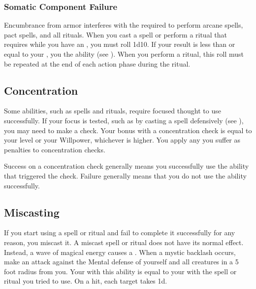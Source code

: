         \subsubsection{Somatic Component Failure}\label{Somatic Component Failure}
            Encumbrance from armor interferes with the  required to perform arcane spells, pact spells, and all rituals.
            When you cast a spell or perform a ritual that requires  while you have an , you must roll 1d10.
            If your result is less than or equal to your , you  the ability (see ).
            When you perform a ritual, this roll must be repeated at the end of each action phase during the ritual.


    \subsection{Concentration}\label{Concentration}
        Some abilities, such as spells and rituals, require focused thought to use successfully.
        If your focus is tested, such as by casting a spell defensively (see ), you may need to make a  check.
        Your bonus with a concentration check is equal to your level or your Willpower, whichever is higher.
        You apply any  you suffer as penalties to concentration checks.

        Success on a concentration check generally means you successfully use the ability that triggered the check.
        Failure generally means that you do not use the ability successfully.

    \subsection{Miscasting}\label{Miscasting}

        If you start using a spell or ritual and fail to complete it successfully for any reason, you miscast it.
        A miscast spell or ritual does not have its normal effect.
        Instead, a wave of magical energy causes a .
        When a mystic backlash occurs, make an attack against the Mental defense of yourself and all creatures in a 5 foot radius from you.
        Your  with this ability is equal to your  with the spell or ritual you tried to use.
        On a hit, each target takes  \minus1d.

